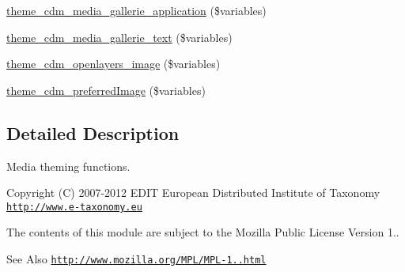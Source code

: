 \begin{DoxyCompactItemize}
\item 
\hyperlink{cdm__dataportal_8media_8theme_aec69676d90bdf4742325f84adce03f1c}{theme\-\_\-cdm\-\_\-media\-\_\-gallerie\-\_\-application} (\$variables)
\item 
\hyperlink{cdm__dataportal_8media_8theme_afc439e2f45d1ca642937ef5dceb393f4}{theme\-\_\-cdm\-\_\-media\-\_\-gallerie\-\_\-text} (\$variables)
\item 
\hyperlink{cdm__dataportal_8media_8theme_ab1415cc722577652ee19c3248dbe74ba}{theme\-\_\-cdm\-\_\-openlayers\-\_\-image} (\$variables)
\item 
\hyperlink{cdm__dataportal_8media_8theme_aae1240d0f2ce2b056dbdd57f467d274a}{theme\-\_\-cdm\-\_\-preferred\-Image} (\$variables)
\end{DoxyCompactItemize}


\subsection{Detailed Description}
Media theming functions.

\begin{DoxyCopyright}{Copyright}
(C) 2007-\/2012 E\-D\-I\-T European Distributed Institute of Taxonomy \href{http://www.e-taxonomy.eu}{\tt http\-://www.\-e-\/taxonomy.\-eu}
\end{DoxyCopyright}
The contents of this module are subject to the Mozilla Public License Version 1.. \begin{DoxySeeAlso}{See Also}
\href{http://www.mozilla.org/MPL/MPL-1.1.html}{\tt http\-://www.\-mozilla.\-org/\-M\-P\-L/\-M\-P\-L-\/1..\-html} 
\end{DoxySeeAlso}


